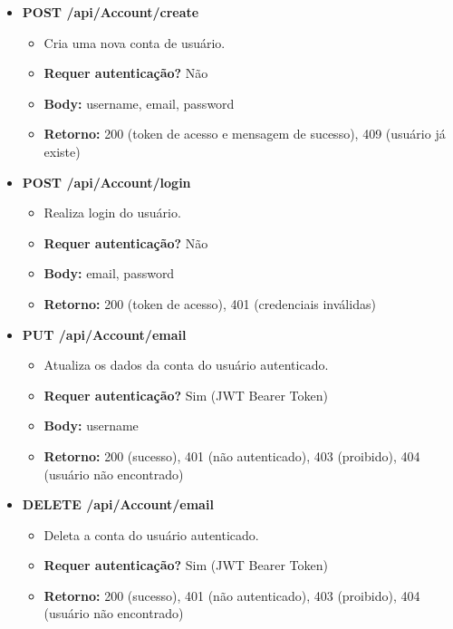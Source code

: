 \begin{itemize}
    \item \textbf{POST /api/Account/create}
    \begin{itemize}
        \item Cria uma nova conta de usuário.
        \item \textbf{Requer autenticação?} Não
        \item \textbf{Body:} username, email, password
        \item \textbf{Retorno:} 200 (token de acesso e mensagem de sucesso), 409 (usuário já existe)
    \end{itemize}
    \item \textbf{POST /api/Account/login}
    \begin{itemize}
        \item Realiza login do usuário.
        \item \textbf{Requer autenticação?} Não
        \item \textbf{Body:} email, password
        \item \textbf{Retorno:} 200 (token de acesso), 401 (credenciais inválidas)
    \end{itemize}
    \item \textbf{PUT /api/Account/{email}}
    \begin{itemize}
        \item Atualiza os dados da conta do usuário autenticado.
        \item \textbf{Requer autenticação?} Sim (JWT Bearer Token)
        \item \textbf{Body:} username
        \item \textbf{Retorno:} 200 (sucesso), 401 (não autenticado), 403 (proibido), 404 (usuário não encontrado)
    \end{itemize}
    \item \textbf{DELETE /api/Account/{email}}
    \begin{itemize}
        \item Deleta a conta do usuário autenticado.
        \item \textbf{Requer autenticação?} Sim (JWT Bearer Token)
        \item \textbf{Retorno:} 200 (sucesso), 401 (não autenticado), 403 (proibido), 404 (usuário não encontrado)
    \end{itemize}
\end{itemize}


